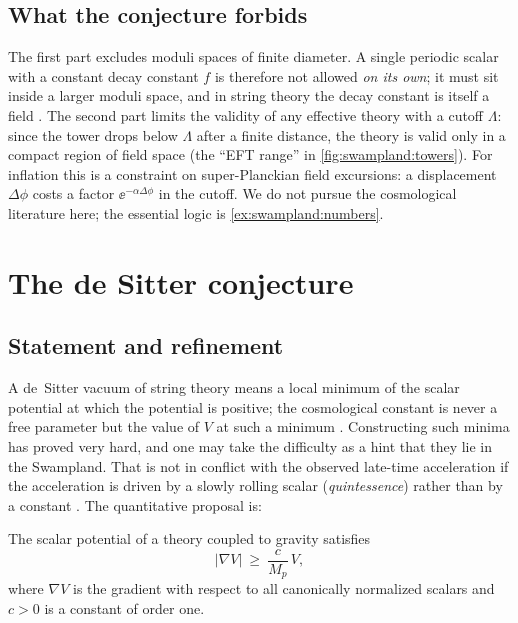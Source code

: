 \subsection{What the conjecture forbids}

The first part excludes moduli spaces of finite diameter. A single periodic scalar with a
constant decay constant $f$ is therefore not allowed \emph{on its own}; it must sit inside a larger
moduli space, and in string theory the decay constant is itself a field . The second part limits the validity of any effective theory with a cutoff
$\Lambda$: since the tower drops below $\Lambda$ after a finite distance, the theory is valid only in
a compact region of field space (the ``EFT range'' in \cref{fig:swampland:towers}). For inflation
this is a constraint on super-Planckian field excursions: a displacement $\Delta\phi$ costs a factor
$\ee^{-\alpha\Delta\phi}$ in the cutoff. We do not pursue the cosmological literature here; the
essential logic is \cref{ex:swampland:numbers}.

\section{The de Sitter conjecture}\label{sec:swampland:ds}

\subsection{Statement and refinement}

A de~Sitter vacuum of string theory means a local minimum of the scalar potential at which the
potential is positive; the cosmological constant is never a free parameter but the value of $V$
at such a minimum . Constructing such minima has proved very
hard, and one may take the difficulty as a hint that they lie in the Swampland. That is not in
conflict with the observed late-time acceleration if the acceleration is driven by a slowly
rolling scalar (\emph{quintessence}) rather than by a constant .
The quantitative proposal is:

\begin{conjecture}\label{conj:swampland:ds}
The scalar potential of a theory coupled to gravity satisfies
\begin{equation}\label{eq:swampland:ds}
|\nabla V|\ \ge\ \frac{c}{M_p}\,V ,
\end{equation}
where $\nabla V$ is the gradient with respect to all canonically normalized scalars and $c>0$ is a
constant of order one. 
\end{conjecture}

